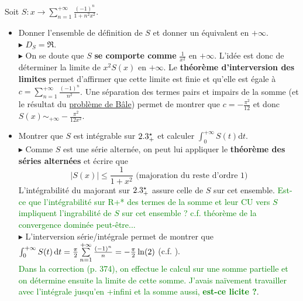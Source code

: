 Soit $S:x \to \sum\limits_{n=1}^{+\infty} \frac{(-1)^n}{1+n^2 x^2}$.
\begin{itemize}
    \item Donner l'ensemble de définition de $S$ et donner un équivalent en $+\infty$.\\
    $\blacktriangleright$  $D_S = \Re$.\\
    $\blacktriangleright$ On se doute que $S$ \textbf{se comporte comme} $\frac{1}{x^2}$ en $+\infty$. L'idée est donc de déterminer la limite de $x^2 S(x)$ en $+\infty$. Le \textbf{théorème d'interversion des limites} permet d'affirmer que cette limite est finie et qu'elle est égale à $c = \sum\limits_{n=1}^{+\infty} \frac{(-1)^n}{n^2}$. Une séparation des termes pairs et impairs de la somme (et le résultat du \href{https://fr.wikipedia.org/wiki/Problème_de_Bâle}{problème de Bâle}) permet de montrer que $c = -\frac{\pi^2}{12}$ et donc $S(x) \sim_{+\infty} -\frac{\pi^2}{12x^2}$.
    \item Montrer que $S$ est intégrable sur $2.3^\star_+$ et calculer $\int_0^{+\infty} S(t) \mathrm{d}t$.\\
    $\blacktriangleright$ Comme $S$ est une série alternée, on peut lui appliquer le \textbf{théorème des séries alternées} et écrire que 
    $$|S(x)| \leqslant \frac{1}{1+x^2} \text{ (majoration du reste d'ordre 1)}$$
    L'intégrabilité du majorant sur $2.3^\star_+$ assure celle de $S$ sur cet ensemble. \textcolor{green}{Est-ce que l'intégrabilité sur R+* des termes de la somme et leur CU vers $S$ impliquent l'ingrabilité de $S$ sur cet ensemble ? c.f. théorème de la convergence dominée peut-être...}\\
    $\blacktriangleright$ L'interversion série/intégrale permet de montrer que $\int_0^{+\infty} S(t) \, \mathrm{d} t = \frac{\pi}{2} \sum\limits_{n=1}^{+\infty} \frac{(-1)^n}{n} = -\frac{\pi}{2} \ln(2)$ (c.f. ).\\
    \textcolor{green}{Dans la correction (p. 374), on effectue le calcul sur une somme partielle et on détermine ensuite la limite de cette somme. J'avais naïvement travailler avec l'intégrale jusqu'en +infini et la somme aussi, \textbf{est-ce licite ?}}.
\end{itemize}